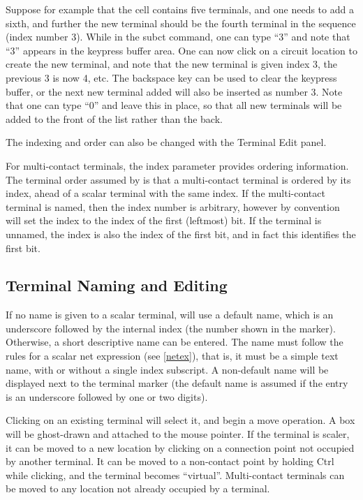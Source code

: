 Suppose for example that the cell contains five terminals, and one
needs to add a sixth, and further the new terminal should be the
fourth terminal in the sequence (index number 3).  While in the {\cb
subct} command, one can type ``3'' and note that ``3'' appears in the
keypress buffer area.  One can now click on a circuit location to
create the new terminal, and note that the new terminal is given index
3, the previous 3 is now 4, etc.  The backspace key can be used to
clear the keypress buffer, or the next new terminal added will also be
inserted as number 3.  Note that one can type ``0'' and leave this in
place, so that all new terminals will be added to the front of the
list rather than the back.

The indexing and order can also be changed with the {\cb Terminal Edit}
panel.

For multi-contact terminals, the index parameter provides ordering
information.  The terminal order assumed by {\Xic} is that a
multi-contact terminal is ordered by its index, ahead of a scalar
terminal with the same index.  If the multi-contact terminal is named,
then the index number is arbitrary, however by convention {\Xic} will
set the index to the index of the first (leftmost) bit.  If the
terminal is unnamed, the index is also the index of the first bit, and
in fact this identifies the first bit.

\subsection{Terminal Naming and Editing}

If no name is given to a scalar terminal, {\Xic} will use a default
name, which is an underscore followed by the internal index (the
number shown in the marker).  Otherwise, a short descriptive name can
be entered.  The name must follow the rules for a scalar net
expression (see \ref{netex}), that is, it must be a simple text name,
with or without a single index subscript.  A non-default name will be
displayed next to the terminal marker (the default name is assumed if
the entry is an underscore followed by one or two digits).

Clicking on an existing terminal will select it, and begin a move
operation.  A box will be ghost-drawn and attached to the mouse
pointer.  If the terminal is scaler, it can be moved to a new location
by clicking on a connection point not occupied by another terminal. 
It can be moved to a non-contact point by holding {\kb Ctrl} while
clicking, and the terminal becomes ``virtual''.  Multi-contact
terminals can be moved to any location not already occupied by a
terminal.

